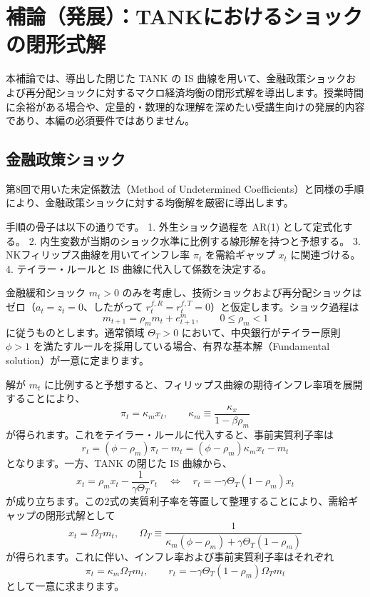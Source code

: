 \documentclass[
  japanese,
  lualatex,
  ja=standard,
  12pt,
  a4paper]{ltjsarticle}
\begin{document}
\clearpage

\section{補論（発展）：TANKにおけるショックの閉形式解}\label{ux88dcux8ad6ux767aux5c55tankux306bux304aux3051ux308bux30b7ux30e7ux30c3ux30afux306eux9589ux5f62ux5f0fux89e3}

本補論では、導出した閉じた TANK の IS
曲線を用いて、金融政策ショックおよび再分配ショックに対するマクロ経済均衡の閉形式解を導出します。授業時間に余裕がある場合や、定量的・数理的な理解を深めたい受講生向けの発展的内容であり、本編の必須要件ではありません。

\subsection{金融政策ショック}\label{ux91d1ux878dux653fux7b56ux30b7ux30e7ux30c3ux30af}

第8回で用いた未定係数法（Method of Undetermined
Coefficients）と同様の手順により、金融政策ショックに対する均衡解を厳密に導出します。

手順の骨子は以下の通りです。 1. 外生ショック過程を AR(1)
として定式化する。 2.
内生変数が当期のショック水準に比例する線形解を持つと予想する。 3.
NKフィリップス曲線を用いてインフレ率 \(\pi_t\) を需給ギャップ \(x_t\)
に関連づける。 4. テイラー・ルールと IS 曲線に代入して係数を決定する。


金融緩和ショック \(m_t > 0\)
のみを考慮し、技術ショックおよび再分配ショックはゼロ（\(a_t = z_t = 0\)、したがって
\(r_t^{f,R} = r_t^{f,T} = 0\)）と仮定します。ショック過程は \[
m_{t+1} = \rho_m m_t + e_{t+1}^m,
\qquad 0 \leq \rho_m < 1
\] に従うものとします。通常領域 \(\Theta_T > 0\)
において、中央銀行がテイラー原則 \(\phi > 1\)
を満たすルールを採用している場合、有界な基本解（Fundamental
solution）が一意に定まります。

解が \(m_t\)
に比例すると予想すると、フィリップス曲線の期待インフレ率項を展開することにより、
\[
\pi_t = \kappa_m x_t,
\qquad
\kappa_m \equiv \frac{\kappa_x}{1 - \beta \rho_m}
\] が得られます。これをテイラー・ルールに代入すると、事前実質利子率は \[
r_t = (\phi - \rho_m) \pi_t - m_t = (\phi - \rho_m) \kappa_m x_t - m_t
\] となります。一方、TANK の閉じた IS 曲線から、 \[
x_t = \rho_m x_t - \frac{1}{\gamma \Theta_T} r_t
\quad \iff \quad
r_t = -\gamma \Theta_T (1 - \rho_m) x_t
\]
が成り立ちます。この2式の実質利子率を等置して整理することにより、需給ギャップの閉形式解として
\[
x_t = \Omega_T m_t,
\qquad
\Omega_T \equiv \frac{1}{\kappa_m(\phi - \rho_m) + \gamma \Theta_T(1 - \rho_m)}
\] が得られます。これに伴い、インフレ率および事前実質利子率はそれぞれ \[
\pi_t = \kappa_m \Omega_T m_t,
\qquad
r_t = -\gamma \Theta_T (1 - \rho_m) \Omega_T m_t
\] として一意に求まります。
\end{document}
